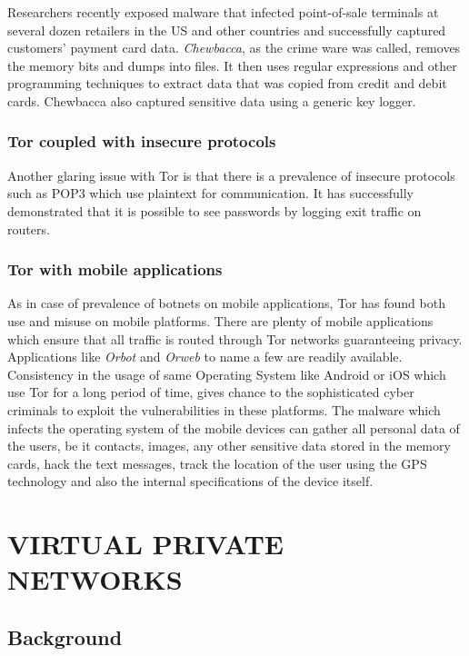 \documentclass[letterpaper, 10 pt, conference]{ieeeconf}
\begin{document}
Researchers recently exposed malware that infected point-of-sale terminals at several dozen retailers in the US and other countries and successfully captured customers' payment card data. \textit{Chewbacca}, as the crime ware was called, removes the memory bits and dumps into files. It then uses regular expressions and other programming techniques to extract data that was copied from credit and debit cards. Chewbacca also captured sensitive data using a generic key logger.\\

\subsubsection{Tor coupled with insecure protocols}

Another glaring issue with Tor is that there is a prevalence of insecure protocols such as POP3 which use plaintext for communication. It has successfully demonstrated that it is possible to see passwords by logging exit traffic on routers.\\

\subsubsection{Tor with mobile applications}

As in case of prevalence of botnets on mobile applications, Tor has found both use and misuse on mobile platforms. There are plenty of mobile applications which ensure that all traffic is routed through Tor networks guaranteeing privacy. Applications like \textit{Orbot} and \textit{Orweb} to name a few are readily available.\\

Consistency in the usage of same Operating System like Android or iOS which use Tor for a long period of time, gives chance to the sophisticated cyber criminals to exploit the vulnerabilities in these platforms. The malware which infects the operating system of the mobile devices can gather all personal data of the users, be it contacts, images, any other sensitive data stored in the memory cards, hack the text messages, track the location of the user using the GPS technology and also the internal specifications of the device itself.

\section{VIRTUAL PRIVATE NETWORKS}
\subsection{Background}
\end{document}
